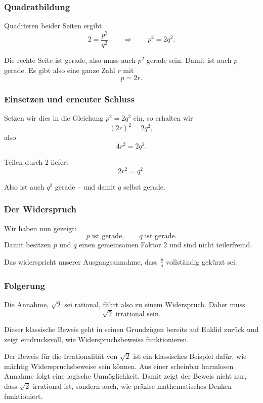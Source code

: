 \subsubsection*{Quadratbildung}

Quadrieren beider Seiten ergibt
\[
2 = \frac{p^2}{q^2}
\qquad\Rightarrow\qquad
p^2 = 2q^2.
\]

Die rechte Seite ist gerade, also muss auch $p^2$ gerade sein.
Damit ist auch $p$ gerade. Es gibt also eine ganze Zahl $r$ mit
\[
p = 2r.
\]

\subsubsection*{Einsetzen und erneuter Schluss}

Setzen wir dies in die Gleichung $p^2 = 2q^2$ ein, so erhalten wir
\[
(2r)^2 = 2q^2,
\]
also
\[
4r^2 = 2q^2.
\]

Teilen durch $2$ liefert
\[
2r^2 = q^2.
\]

Also ist auch $q^2$ gerade -- und damit $q$ selbst gerade.

\subsubsection*{Der Widerspruch}

Wir haben nun gezeigt:
\[
p \text{ ist gerade}, \qquad q \text{ ist gerade}.
\]
Damit besitzen $p$ und $q$ einen gemeinsamen Faktor $2$ und sind nicht
teilerfremd.

Das widerspricht unserer Ausgangsannahme, dass $\frac{p}{q}$ vollständig
gekürzt sei.

\subsubsection*{Folgerung}

Die Annahme, $\sqrt{2}$ sei rational, führt also zu einem Widerspruch.
Daher muss
\[
\sqrt{2} \text{ irrational sein.}
\]

Dieser klassische Beweis geht in seinen Grundzügen bereits auf Euklid
zurück und zeigt eindrucksvoll, wie Widerspruchsbeweise funktionieren.

\begin{DidacticBox}
	\label{box:beweis-elegant}
	Der Beweis für die Irrationalität von $\sqrt{2}$ ist ein klassisches
	Beispiel dafür, wie mächtig Widerspruchsbeweise sein können.
	Aus einer scheinbar harmlosen Annahme folgt eine logische Unmöglichkeit.
	Damit zeigt der Beweis nicht nur, dass $\sqrt{2}$ irrational ist,
	sondern auch, wie präzise mathematisches Denken funktioniert.
\end{DidacticBox}

